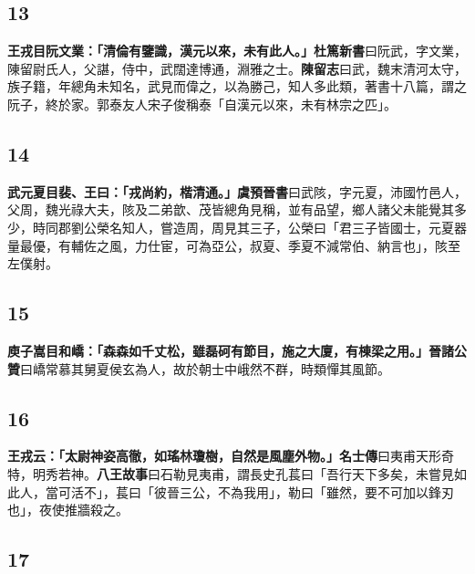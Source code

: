 \subsection*{13}

\textbf{王戎目阮文業：「清倫有鑒識，漢元以來，未有此人。」}{\footnotesize \textbf{杜篤新書}曰阮武，字文業，陳留尉氏人，父諶，侍中，武闊達博通，淵雅之士。\textbf{陳留志}曰武，魏末清河太守，族子籍，年總角未知名，武見而偉之，以為勝己，知人多此類，著書十八篇，謂之阮子，終於家。郭泰友人宋子俊稱泰「自漢元以來，未有林宗之匹」。}

\subsection*{14}

\textbf{武元夏目裴、王曰：「戎尚約，楷清通。」}{\footnotesize \textbf{虞預晉書}曰武陔，字元夏，沛國竹邑人，父周，魏光祿大夫，陔及二弟歆、茂皆總角見稱，並有品望，鄉人諸父未能覺其多少，時同郡劉公榮名知人，嘗造周，周見其三子，公榮曰「君三子皆國士，元夏器量最優，有輔佐之風，力仕宦，可為亞公，叔夏、季夏不減常伯、納言也」，陔至左僕射。}

\subsection*{15}

\textbf{庾子嵩目和嶠：「森森如千丈松，雖磊砢有節目，施之大廈，有棟梁之用。」}{\footnotesize \textbf{晉諸公贊}曰嶠常慕其舅夏侯玄為人，故於朝士中峨然不群，時類憚其風節。}

\subsection*{16}

\textbf{王戎云：「太尉神姿高徹，如瑤林瓊樹，自然是風塵外物。」}{\footnotesize \textbf{名士傳}曰夷甫天形奇特，明秀若神。\textbf{八王故事}曰石勒見夷甫，謂長史孔萇曰「吾行天下多矣，未嘗見如此人，當可活不」，萇曰「彼晉三公，不為我用」，勒曰「雖然，要不可加以鋒刃也」，夜使推牆殺之。}

\subsection*{17}

